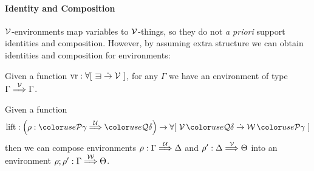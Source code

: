 
\paragraph{Identity and Composition} $\mathcal V$-environments map variables
to $\mathcal V$-things, so they do not {\it a priori} support identities and
composition. However, by assuming extra structure we can obtain
identities and composition for environments:

\begin{lemma}\label{thm:env-id}
  Given a function $\mathrm{vr} : \forallb{{\sqni} \dotto \V}$, for any
  $\Gamma$ we have an environment of type $\Gamma \stackrel{\mathcal V}\Longrightarrow \Gamma$.
\end{lemma}

\begin{lemma}\label{thm:env-comp}
  Given a function
  \begin{displaymath}
    \mathrm{lift} : \plr{\rho : \grP\gamma \env\U \grQ\delta} \to \forallb{\V\,\grQ\delta \dotto \W\,\grP\gamma}
  \end{displaymath}
  then we can compose environments $\rho : \Gamma \stackrel{\mathcal U}\Longrightarrow \Delta$ and
  $\rho' : \Delta \stackrel{\mathcal V}\Longrightarrow \Theta$ into an environment
  $\rho; \rho' : \Gamma \stackrel{\mathcal W}\Longrightarrow \Theta$.
\end{lemma}



